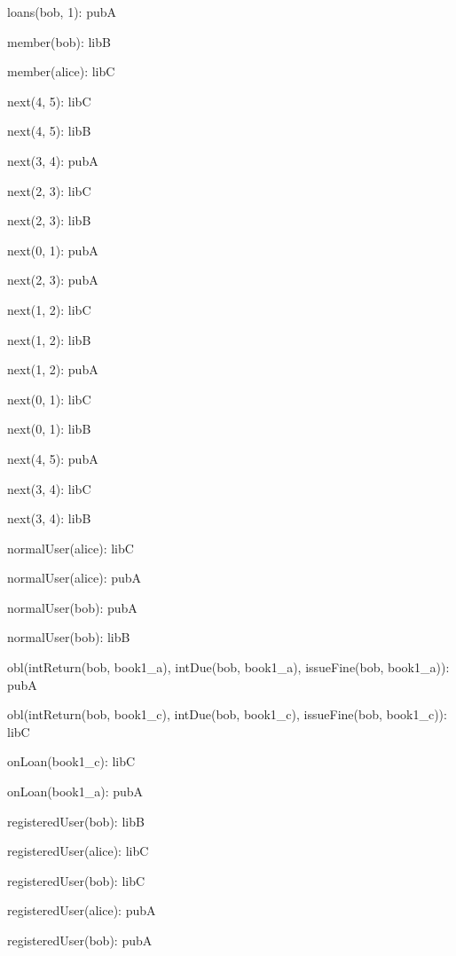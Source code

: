 \documentclass{article}
\newenvironment{states}
        {\begin{minipage}{\tableWidth}\raggedright\begin{description}[align=left,leftmargin=1em,noitemsep,labelsep=\parindent]}
        {\end{description}\end{minipage}}
\begin{document}
{\begin{states}
\item{{loans(\allowbreak{}bob, 1): pubA}}
\item{{member(\allowbreak{}bob): libB}}
\item{{member(\allowbreak{}alice): libC}}
\item{{next(\allowbreak{}4, 5): libC}}
\item{{next(\allowbreak{}4, 5): libB}}
\item{{next(\allowbreak{}3, 4): pubA}}
\item{{next(\allowbreak{}2, 3): libC}}
\item{{next(\allowbreak{}2, 3): libB}}
\item{{next(\allowbreak{}0, 1): pubA}}
\item{{next(\allowbreak{}2, 3): pubA}}
\item{{next(\allowbreak{}1, 2): libC}}
\item{{next(\allowbreak{}1, 2): libB}}
\item{{next(\allowbreak{}1, 2): pubA}}
\item{{next(\allowbreak{}0, 1): libC}}
\item{{next(\allowbreak{}0, 1): libB}}
\item{{next(\allowbreak{}4, 5): pubA}}
\item{{next(\allowbreak{}3, 4): libC}}
\item{{next(\allowbreak{}3, 4): libB}}
\item{{normalUser(\allowbreak{}alice): libC}}
\item{{normalUser(\allowbreak{}alice): pubA}}
\item{{normalUser(\allowbreak{}bob): pubA}}
\item{{normalUser(\allowbreak{}bob): libB}}
\item{{obl(\allowbreak{}intReturn(\allowbreak{}bob, book1\_a), intDue(\allowbreak{}bob, book1\_a), issueFine(\allowbreak{}bob, book1\_a)): pubA}}
\item{{obl(\allowbreak{}intReturn(\allowbreak{}bob, book1\_c), intDue(\allowbreak{}bob, book1\_c), issueFine(\allowbreak{}bob, book1\_c)): libC}}
\item{{onLoan(\allowbreak{}book1\_c): libC}}
\item{{onLoan(\allowbreak{}book1\_a): pubA}}
\item{{registeredUser(\allowbreak{}bob): libB}}
\item{{registeredUser(\allowbreak{}alice): libC}}
\item{{registeredUser(\allowbreak{}bob): libC}}
\item{{registeredUser(\allowbreak{}alice): pubA}}
\item{{registeredUser(\allowbreak{}bob): pubA}}
\end{states}}
\end{document}
